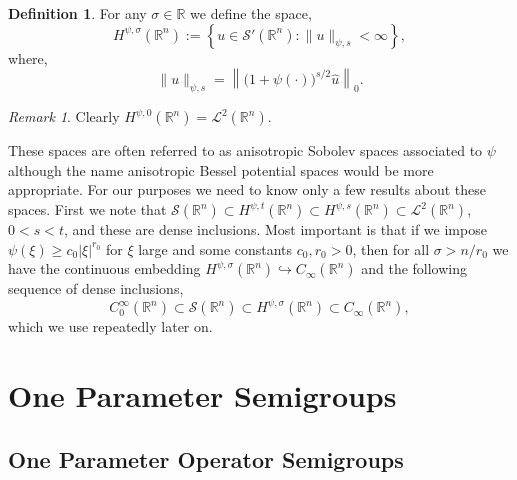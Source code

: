 \documentclass[a4paper, 12pt]{report}
\theoremstyle{remark}
\newtheorem{remark}[theorem]{Remark}
\theoremstyle{definition}
\newtheorem{definition}[theorem]{Definition}
\begin{document}
\begin{definition}
For any $\sigma \in \mathbb{R}$ we define the space,
\begin{equation}
H^{\psi, \sigma}(\mathbb{R}^n) := \left\{u \in \mathcal{S}'(\mathbb{R}^n) : \|u\|_{\psi, s} < \infty\right\},
\end{equation}
where,
\begin{equation}
\|u\|_{\psi, s} = \left\|\big(1 + \psi(\cdot)\big)^{s/2}\hat{u}\right\|_0.
\end{equation}
\end{definition}
\begin{remark}
Clearly $H^{\psi, 0}(\mathbb{R}^n) = \mathcal{L}^2(\mathbb{R}^n)$.
\end{remark}
These spaces are often referred to as anisotropic Sobolev spaces associated to $\psi$ although the name anisotropic Bessel potential spaces would be more appropriate.
For our purposes we need to know only a few results about these spaces.  First we note that $\mathcal{S}(\mathbb{R}^n) \subset H^{\psi, t}(\mathbb{R}^n) \subset H^{\psi, s}(\mathbb{R}^n) \subset \mathcal{L}^2(\mathbb{R}^n)$, $0 < s < t$, and these are dense inclusions.  Most important is that if we impose $\psi(\xi) \ge c_0|\xi|^{r_0}$ for $\xi$ large and some constants $c_0, r_0 > 0$, then for all $\sigma > n/r_0$ we have the continuous embedding $H^{\psi, \sigma}(\mathbb{R}^n) \hookrightarrow C_\infty(\mathbb{R}^n)$ and the following sequence of dense inclusions,
$$
C_0^\infty(\mathbb{R}^n) \subset \mathcal{S}(\mathbb{R}^n) \subset H^{\psi, \sigma}(\mathbb{R}^n) \subset C_\infty(\mathbb{R}^n),
$$
which we use repeatedly later on.


\chapter{One Parameter Semigroups}\label{Ch.oOPS}

\section{One Parameter Operator Semigroups}\label{Se.OPOS}
\end{document}
